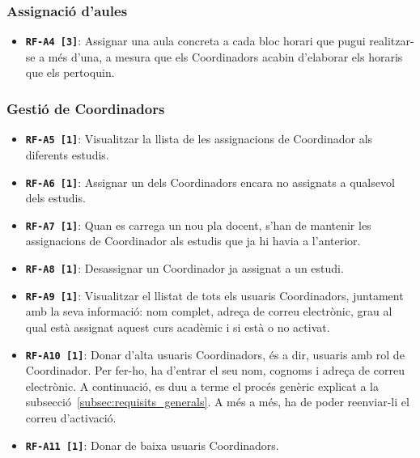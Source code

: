 \documentclass[a4paper,12pt]{ThesisStyle}
\begin{document}
\subsubsection{Assignació d'aules}
\begin{itemize}
  \item \texttt{\textbf{RF-A4 [3]}}: Assignar una aula concreta a cada bloc horari que pugui realitzar-se a més d'una, a mesura que els Coordinadors acabin d'elaborar els horaris que els pertoquin.
\end{itemize}

\subsubsection{Gestió de Coordinadors}
\begin{itemize}
  \item \texttt{\textbf{RF-A5 [1]}}: Visualitzar la llista de les assignacions de Coordinador als diferents estudis.
  \item \texttt{\textbf{RF-A6 [1]}}: Assignar un dels Coordinadors encara no assignats a qualsevol dels estudis.
  \item \texttt{\textbf{RF-A7 [1]}}: Quan es carrega un nou pla docent, s'han de mantenir les assignacions de Coordinador als estudis que ja hi havia a l'anterior.
  \item \texttt{\textbf{RF-A8 [1]}}: Desassignar un Coordinador ja assignat a un estudi.
  \item \texttt{\textbf{RF-A9 [1]}}: Visualitzar el llistat de tots els usuaris Coordinadors, juntament amb la seva informació: nom complet, adreça de correu electrònic, grau al qual està assignat aquest curs acadèmic i si està o no activat.
  \item \texttt{\textbf{RF-A10 [1]}}: Donar d'alta usuaris Coordinadors, és a dir, usuaris amb rol de Coordinador. Per fer-ho, ha d'entrar el seu nom, cognoms i adreça de correu electrònic. A continuació, es duu a terme el procés genèric explicat a la subsecció~\ref{subsec:requisits_generals}. A més a més, ha de poder reenviar-li el correu d'activació.
  \item \texttt{\textbf{RF-A11 [1]}}: Donar de baixa usuaris Coordinadors.
\end{itemize}
\end{document}
